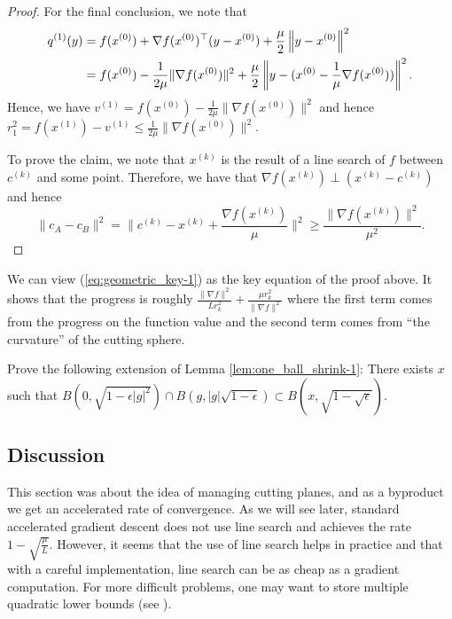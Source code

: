 \begin{proof}
For the final conclusion, we note that
\begin{align*}
q^{(1)}(y) & =f(x^{(0)})+\nabla f(x^{(0)})^{\top}(y-x^{(0)})+\frac{\mu}{2}\left\Vert y-x^{(0)}\right\Vert^{2}\\
 & =f(x^{(0)})-\frac{1}{2\mu}\|\nabla f(x^{(0)})\|^{2}+\frac{\mu}{2}\left\Vert y-(x^{(0)}-\frac{1}{\mu}\nabla f(x^{(0)}))\right\Vert^{2}.
\end{align*}
Hence, we have $v^{(1)}=f(x^{(0)})-\frac{1}{2\mu}\|\nabla f(x^{(0)})\|^{2}$
and hence $r^{2}_{1}=f(x^{(1)})-v^{(1)}\leq\frac{1}{2\mu}\|\nabla f(x^{(0)})\|^{2}$.

To prove the claim, we note that $x^{(k)}$ is the result of a line
search of $f$ between $c^{(k)}$ and some point. Therefore, we have
that $\nabla f(x^{(k)})\perp(x^{(k)}-c^{(k)})$ and hence
\[
\|c_{A}-c_{B}\|^{2}=\|c^{(k)}-x^{(k)}+\frac{\nabla f(x^{(k)})}{\mu}\|^{2}\geq\frac{\|\nabla f(x^{(k)})\|^{2}}{\mu^{2}}.
\]
\end{proof}
\begin{rem}
We can view (\ref{eq:geometric_key-1}) as the key equation of the
proof above. It shows that the progress is roughly $\frac{\|\nabla f\|^{2}}{Lr^{2}_{k}}+\frac{\mu r^{2}_{k}}{\|\nabla f\|^{2}}$
where the first term comes from the progress on the function value
and the second term comes from ``the curvature'' of the cutting
sphere.
\end{rem}

\begin{xca}
Prove the following extension of Lemma \ref{lem:one_ball_shrink-1}:
There exists $x$ such that $B(0,\sqrt{1-\epsilon|g|^{2}})\cap B(g,|g|\sqrt{1-\epsilon})\subset B(x,\sqrt{1-\sqrt{\epsilon}})$.
\end{xca}


\subsection{Discussion}

This section was about the idea of managing cutting planes, and as
a byproduct we get an accelerated rate of convergence. As we will
see later, standard accelerated gradient descent does not use line
search and achieves the rate $1-\sqrt{\frac{\mu}{L}}$. However, it
seems that the use of line search helps in practice and that with
a careful implementation, line search can be as cheap as a gradient
computation. For more difficult problems, one may want to store multiple
quadratic lower bounds (see \cite{drusvyatskiy2016optimal}).
